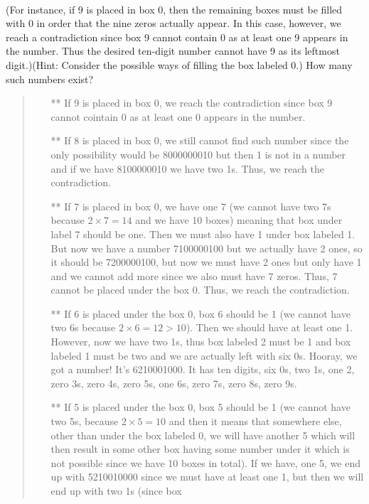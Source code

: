 \documentclass[12pt, a4paper]{article}                      %
\begin{document}
\begin{itemize}
\begin{table}[h!]
\begin{adjustbox}{max width=\textwidth}
{    }
	\end{adjustbox}
\end{table}
\\
(For instance, if 9 is placed in box 0, then the remaining boxes must be filled with
0 in order that the nine zeros actually appear. In this case, however, we reach a contradiction
since box 9 cannot contain 0 as at least one 9 appears in the number. Thus the desired ten-digit
number cannot have 9 as its leftmost digit.)(Hint: Consider the possible ways of filling the box
labeled 0.) How many such numbers exist?
\begin{quote}
\begin{itemize}
\item[**]
If 9 is placed in box 0, we reach the contradiction since box 9 cannot cointain 0 as at least one 0 appears in the number.
\item[**]
If 8 is placed in box 0, we still cannot find such number since the only possibility would be 8000000010 but then 1 is not in a number
and if we have 8100000010 we have two 1s. Thus, we reach the contradiction.
\item[**]
If 7 is placed in box 0, we have one 7 (we cannot have two 7s because $2 \times 7 = 14$ and we have 10 boxes) meaning that box under label 7 should be one.
Then we must also have 1 under box labeled 1. But now we have a number 7100000100 but we actually have 2 ones, so it should be 7200000100, but now we must have
2 ones but only have 1 and we cannot add more since we also must have 7 zeros. Thus, 7 cannot be placed under the box 0. Thus, we reach the contradiction.
\item[**]
If 6 is placed under the box 0, box 6 should be 1 (we cannot have two 6s because $2 \times 6 = 12 > 10$). Then we should have at least one 1.
However, now we have two 1s, thus box labeled 2 must be 1 and box labeled 1 must be two and we are actually left with six 0s.
Hooray, we got a number! It's 6210001000. It has ten digits, six 0s, two 1s, one 2, zero 3s, zero 4s, zero 5s, one 6s, zero 7s, zero 8s, zero 9s.
\item[**]
If 5 is placed under the box 0, box 5 should be 1 (we cannot have two 5s, because $2 \times 5 = 10$ and then it means that
somewhere else, other than under the box labeled 0, we will have another 5 which will then result in some other box having
some number under it which is not possible since we have 10 boxes in total).
If we have, one 5, we end up with 5210010000 since we must have at least one 1, but then we will end up with two 1s (since box

\end{itemize}
\end{quote}
\end{itemize}
\end{document}
